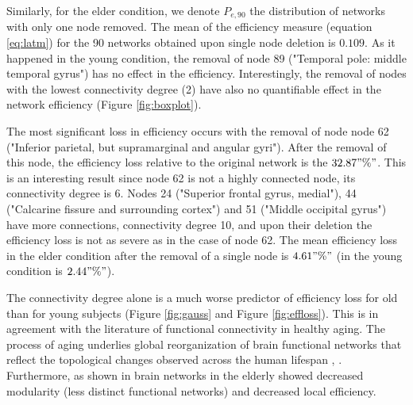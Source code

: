 \documentclass[12pt,a4paper]{article}
\begin{document}
Similarly, for the elder condition, we denote $P_{e, 90}$ the distribution of networks with only one node removed. 
The mean of the efficiency measure (equation \ref{eq:latm}) for the 90 networks obtained upon single node deletion is $0.109$. As it happened in the young condition, the removal of node 89 ("Temporal pole: middle temporal gyrus") has no effect in the efficiency. 
Interestingly, the removal of nodes with the lowest connectivity degree (2) have also no quantifiable effect in the network efficiency (Figure \ref{fig:boxplot}). 

The most significant loss in efficiency occurs with the removal of node node 62 ("Inferior parietal, but supramarginal and angular gyri"). After the removal of this node, the efficiency loss relative to the original network is the $32.87"\%"$. This is an interesting result since node 62 is not a highly connected node, its connectivity degree is 6. Nodes 24 ("Superior frontal gyrus, medial"), 44 ("Calcarine fissure and surrounding cortex") and 51 ("Middle occipital gyrus") have more connections, connectivity degree 10, and upon their deletion the efficiency loss is not as severe as in the case of node 62. 
The mean efficiency loss in the elder condition after the removal of a single node is  $4.61"\%"$ (in the young condition is $2.44"\%"$). 

The connectivity degree alone is a much worse predictor of efficiency loss for old than for young subjects (Figure \ref{fig:gauss} and Figure \ref{fig:effloss}). This is in agreement with the literature of functional connectivity in healthy aging. The process of aging underlies global reorganization of brain functional networks that reflect the topological changes observed across the human lifespan \cite{cao_topological_2014}, \cite{song_age-related_2014}.  
Furthermore, as shown in \cite{geerligs_brain-wide_2015} brain networks in the elderly showed decreased modularity (less distinct functional networks) and decreased local efficiency.
\end{document}

